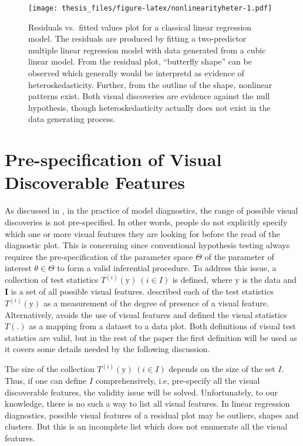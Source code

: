 \documentclass{monashthesis}
\theoremstyle{definition}
\theoremstyle{definition}
\theoremstyle{definition}
\theoremstyle{definition}
\theoremstyle{remark}
\begin{document}
\begin{figure}
\centering
\texttt{[image: thesis\_files/figure-latex/nonlinearityheter-1.pdf]}
\caption{\label{fig:nonlinearityheter}Residuals vs.~fitted values plot for a classical linear regression model. The residuals are produced by fitting a two-predictor multiple linear regression model with data generated from a cubic linear model. From the residual plot, ``butterfly shape'' can be observed which generally would be interpretd as evidence of heteroskedasticity. Further, from the outline of the shape, nonlinear patterns exist. Both visual discoveries are evidence against the null hypothesis, though heteroskedasticity actually does not exist in the data generating process.}
\end{figure}

\hypertarget{pre-specification-of-visual-discoverable-features}{%
\section{Pre-specification of Visual Discoverable Features}\label{pre-specification-of-visual-discoverable-features}}

As discussed in \textcite{buja_statistical_2009}, in the practice of model diagnostics, the range of possible visual discoveries is not pre-specified. In other words, people do not explicitly specify which one or more visual features they are looking for before the read of the diagnostic plot. This is concerning since conventional hypothesis testing always requires the pre-specification of the parameter space \(\Theta\) of the parameter of interest \(\theta \in \Theta\) to form a valid inferential procedure. To address this issue, a collection of test statistics \(T^{(i)}(\boldsymbol{\mathrm{y}})~(i \in I)\) is defined, where \(\boldsymbol{\mathrm{y}}\) is the data and \(\boldsymbol{I}\) is a set of all possible visual features. \textcite{buja_statistical_2009} described each of the test statistics \(T^{(i)}(\boldsymbol{\mathrm{y}})\) as a measurement of the degree of presence of a visual feature. Alternatively, \textcite{majumder_validation_2013} avoids the use of visual features and defined the visual statistics \(T(.)\) as a mapping from a dataset to a data plot. Both definitions of visual test statistics are valid, but in the rest of the paper the first definition will be used as it covers some details needed by the following discussion.

The size of the collection \(T^{(i)}(\boldsymbol{\mathrm{y}})~(i \in I)\) depends on the size of the set \(I\). Thus, if one can define \(I\) comprehensively, i.e, pre-specify all the visual discoverable features, the validity issue will be solved. Unfortunately, to our knowledge, there is no such a way to list all visual features. In linear regression diagnostics, possible visual features of a residual plot may be outliers, shapes and clusters. But this is an incomplete list which does not enumerate all the visual features.
\end{document}
